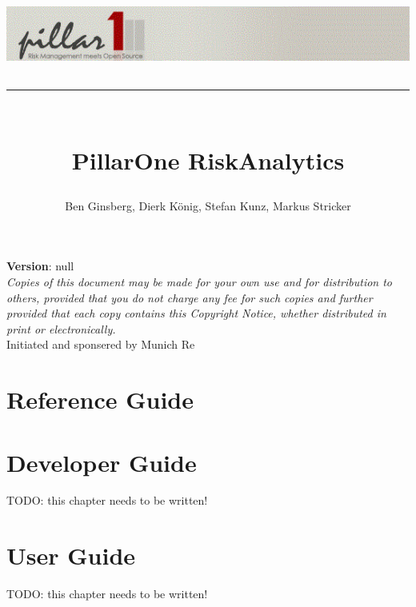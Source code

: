 \documentclass[11pt,a4,english]{book}
\begin{document}

\begin{titlepage}
\title{\includegraphics{images/logo.png}\\[0.2cm]
\textcolor{light-gray}{\rule{\linewidth}{1pt}}\\[1cm]
PillarOne RiskAnalytics\\[1cm]}
\author{Ben Ginsberg, Dierk K\"{o}nig, Stefan Kunz, Markus Stricker}
\date{}
\maketitle

\begin{flushleft}
{\small{{\bfseries Version}: null\\[1cm]

\emph{Copies of this document may be made for your own use and for distribution to others, provided that you do not charge any fee for such copies and further provided that each copy contains this Copyright Notice, whether distributed in print or electronically.}\\[1cm]

Initiated and sponsered by Munich Re}}
\end{flushleft}

\tableofcontents

\end{titlepage}

\chapter{Reference Guide}







\chapter{Developer Guide}

TODO: this chapter needs to be written!

\chapter{User Guide}

TODO: this chapter needs to be written!
\end{document}
